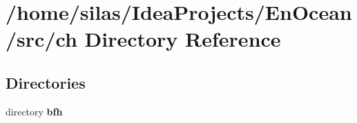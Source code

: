 \section{/home/silas/\+Idea\+Projects/\+En\+Ocean/src/ch Directory Reference}
\label{dir_12316fcaf64173b9a92c525552ec07f0}
\subsection*{Directories}
\begin{DoxyCompactItemize}
\item 
directory {\bf bfh}
\end{DoxyCompactItemize}
